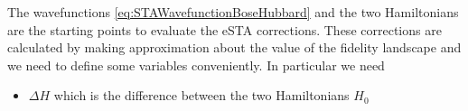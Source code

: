 The wavefunctions \cref{eq:STAWavefunctionBoseHubbard} and the two Hamiltonians are the starting points to evaluate the eSTA corrections.
These corrections are calculated by making approximation about the value of the fidelity landscape and we need to define some variables conveniently.
In particular we need
\begin{itemize}
	\item $\Delta H$ which is the difference between the two Hamiltonians $ H _{0}$
\end{itemize}


